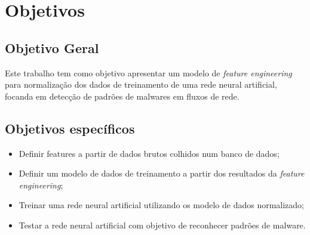 \chapter[Objetivos]{Objetivos}

\section{Objetivo Geral}
    Este trabalho tem como objetivo apresentar um modelo de \textit{feature engineering} para normalização dos dados de treinamento de uma rede neural artificial, focanda em detecção de padrões de malwares em fluxos de rede.


\section{Objetivos específicos}
    \begin{itemize}
        \item Definir features a partir de dados brutos colhidos num banco de dados;
        \item Definir um modelo de dados de treinamento a partir dos resultados da \textit{feature engineering};
        \item Treinar uma rede neural artificial utilizando os modelo de dados normalizado;
        \item Testar a rede neural artificial com objetivo de reconhecer padrões de malware.
    \end{itemize}